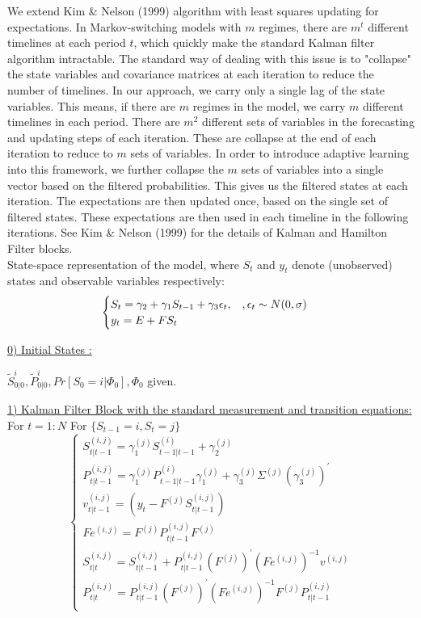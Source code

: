 \documentclass[12pt,reqno]{article}
\numberwithin{equation}{section}
\begin{document}
We extend Kim \& Nelson (1999) algorithm with least squares updating for expectations. In Markov-switching models with $ m $ regimes, there are $ m^t $ different timelines at each period $t$, which quickly make the standard Kalman filter algorithm intractable. The standard way of dealing with this issue is to "collapse" the state variables and covariance matrices at each iteration to reduce the number of timelines. In our approach, we carry only a single lag of the state variables. This means, if there are $ m $ regimes in the model, we carry $ m $ different timelines in each period. There are $ m^2 $ different sets of variables in the forecasting and updating steps of each iteration. These are collapse at the end of each iteration to reduce to $ m $ sets of variables. In order to introduce adaptive learning into this framework, we further collapse the $ m $ sets of variables into a single vector based on the filtered probabilities. This gives us the filtered states at each iteration. The expectations are then updated once, based on the single set of filtered states. These expectations are then used in each timeline in the following iterations. See Kim \& Nelson (1999) for the details of Kalman and Hamilton Filter blocks.\\


State-space representation of the model, where $S_t $ and $y_t $ denote (unobserved) states and observable variables respectively: \\

$$
\begin{cases}
S_t = \gamma_2 + \gamma_1 S_{t-1} + \gamma_3 \epsilon_t, \hspace{3 mm}, \epsilon_t \sim N(0, \sigma) \\
y_t = E+ F S_t \\
\end{cases}
$$

\noindent
\underline{0) Initial  States :}

$ \tilde{S}_{0|0}^{i}, \tilde{P}_{0|0}^{i}, Pr[ S_0=i | \Phi_0] , \Phi_0$  given.\\
\vspace{6 mm}


\noindent
\underline{1) Kalman Filter Block with the standard measurement and transition equations:} \\
\vspace{6 mm}
For $t=1:N$
    For $\{S_{t-1}=i, S_t=j\} $
\noindent
$$
\begin{cases}
S_{t|t-1}^{(i,j)}=\gamma_1^{(j)} S_{t-1|t-1}^{(i)} + \gamma_2^{(j)} \\
P_{t|t-1}^{(i,j)}=\gamma_1^{(j)} P_{t-1|t-1}^{(i)} \gamma_1^{(j)} + \gamma_3^{(j)} \Sigma^{(j)} (\gamma_3^{(j)})^{\prime} \\
v^{(i,j)}_{t|t-1} = (y_t - F^{(j)} S_{t|t-1}^{(i,j)})\\
Fe^{(i,j)}=F^{(j)} P_{t|t-1}^{(i,j)}F^{(j)} \\
S_{t|t}^{(i,j)}= S_{t|t-1}^{(i,j)} + P_{t|t-1}^{(i,j)} (F^{(j)})^{\prime} {(Fe^{(i,j)})}^{-1} v^{(i,j)} \\
P_{t|t}^{(i,j)} = P_{t|t-1}^{(i,j)} (F^{(j)})^{\prime} (Fe^{(i,j)})^{-1} F^{(j)} P_{t|t-1}^{(i,j)} \\
\end{cases}
$$
\end{document}
